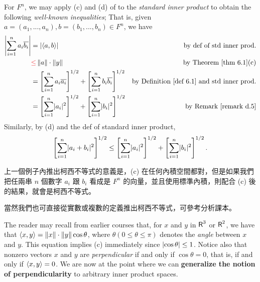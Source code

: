 \begin{example} \label{example 6.1.7}
For \(F^n\), we may apply (c) and (d) of  to the \emph{standard inner product} to obtain the following \emph{well-known inequalities};
That is, given \(a = (a_1, ..., a_n), b = (b_1, ..., b_n) \in F^n\), we have
\begin{align*}
    \left| \sum_{i = 1}^n a_i \conjugatet{b_i} \right|
        & = \left| \LG a, b \RG \right| & \text{by def of std inner prod.} \\
        & \RED{\le} \norm{a} \cdot \norm{y} & \text{by \THM{6.1}(c)} \\
        & = \left[ \sum_{i = 1}^n a_i\conjugatet{a_i} \right]^{1/2} + \left[ \sum_{i = 1}^n b_i\conjugatet{b_i} \right]^{1/2} & \text{by \DEF{6.1} and std inner prod.} \\
        & = \left[ \sum_{i = 1}^n \abs{a_i}^2 \right]^{1/2} + \left[ \sum_{i = 1}^n \abs{b_i}^2 \right]^{1/2} & \text{by \RMK{d.5}}
\end{align*}
Similarly, by (d) and the def of standard inner product,
\[
    \left[ \sum_{i = 1}^n \lvert a_i + b_i\rvert^2 \right]^{1/2} \le \left[ \sum_{i = 1}^n \lvert a_i\rvert^2 \right]^{1/2} + \left[ \sum_{i = 1}^n \lvert b_i\rvert^2 \right]^{1/2}.
\]
\end{example}

\begin{note}
上一個例子內推出柯西不等式的意義是，(c) 在任何內積空間都對，但是如果我們把任兩串 \(n\) 個數字 \(a_i\) 跟 \(b_i\) 看成是 \(F^n\) 的向量，並且使用標準內積，則配合 (c) 後的結果，就會是柯西不等式。

當然我們也可直接從實數或複數的定義推出柯西不等式，可參考分析課本。
\end{note}

The reader may recall from earlier courses that, for \(x\) and \(y\) in \(\textsf{R}^3\) or \(\textsf{R}^2\), we have that \(\left< x, y \right> = \left\lVert x\right\rVert \cdot \left\lVert y\right\rVert \cos \theta\), where \(\theta (0 \le \theta \le \pi)\) denotes the \emph{angle} between \(x\) and \(y\).
This equation implies (c) immediately since \(\lvert \cos \theta \rvert \le 1\).
Notice also that nonzero vectors \(x\) and \(y\) are \emph{perpendicular} if and only if \(\cos \theta = 0\), that is, if and only if \(\left< x, y \right> = 0\).
We are now at the point where we can \textbf{generalize the notion of perpendicularity} to arbitrary inner product spaces.

